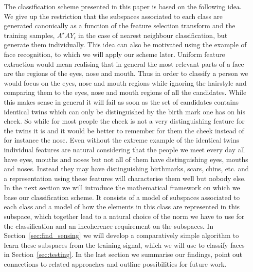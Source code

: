 \documentclass[11pt]{article}
\begin{document}
The classification scheme presented in this paper is based on the following idea. We give up the restriction that the subspaces associated to each class are generated canonically as a function of the feature selection transform and the training samples, \ie $A^\star A Y_i$ in the case of nearest neighbour classification, but generate them individually. This idea can also be motivated using the example of face recognition, to which we will apply our scheme later. Uniform feature extraction would mean realising that in general the most relevant parts of a face are the regions of the eyes, nose and mouth. Thus in order to classify a person we would focus on the eyes, nose and mouth regions while ignoring the hairstyle and comparing them to the eyes, nose and mouth regions of all the candidates. While this makes sense in general it will fail as soon as the set of candidates contains identical twins which can only be distinguished by the birth mark one has on his cheek. So while for most people the cheek is not a very distinguishing feature for the twins it is and it would be better to remember for them the cheek instead of for instance the nose. Even without the extreme example of the identical twins individual features are natural considering that the people we meet every day all have eyes, mouths and noses but not all of them have distinguishing eyes, mouths and noses. Instead they may have distinguishing birthmarks, scars, chins, etc. and a representation using these features will characterise them well but nobody else.\\
In the next section we will introduce the mathematical framework on which we base our classification scheme. It consists of a model of subspaces associated to each class and a model of how the elements in this class are represented in this subspace, which together lead to a natural choice of the norm we have to use for the classification and an incoherence requirement on the subspaces. In Section~\ref{sec:find_sensing} we will develop a comparatively simple algorithm to learn these subspaces from the training signal, which we will use to classify faces in Section~\ref{sec:testing}. In the last section we summarise our findings, point out connections to related approaches and outline possibilities for future work.


\end{document}
